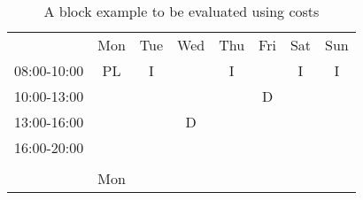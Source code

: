 \begin{table}[]
\centering
\caption{A block example to be evaluated using costs}
\label{my-label}
\begin{tabular}{llllllll}
\multicolumn{1}{c}{}             & \multicolumn{1}{c}{Mon}                         & \multicolumn{1}{c}{Tue} & \multicolumn{1}{c}{Wed}                        & \multicolumn{1}{c}{Thu} & \multicolumn{1}{c}{Fri}                        & \multicolumn{1}{c}{Sat} & \multicolumn{1}{c}{Sun} \\ \cline{2-8} 
\multicolumn{1}{c|}{08:00-10:00} & \multicolumn{1}{c|}{\cellcolor[HTML]{FCFF2F}PL} & \multicolumn{1}{c|}{I}  & \multicolumn{1}{c|}{}                          & \multicolumn{1}{c|}{I}  & \multicolumn{1}{c|}{}                          & \multicolumn{1}{c|}{I}  & \multicolumn{1}{c|}{I}  \\ \cline{2-8} 
\multicolumn{1}{c|}{10:00-13:00} & \multicolumn{1}{c|}{\cellcolor[HTML]{FCFF2F}}   & \multicolumn{1}{c|}{}   & \multicolumn{1}{c|}{}                          & \multicolumn{1}{c|}{}   & \multicolumn{1}{c|}{\cellcolor[HTML]{FCFF2F}D} & \multicolumn{1}{c}{}    & \multicolumn{1}{c}{}    \\ \cline{2-6}
\multicolumn{1}{c|}{13:00-16:00} & \multicolumn{1}{c|}{\cellcolor[HTML]{FCFF2F}}   & \multicolumn{1}{c|}{}   & \multicolumn{1}{c|}{\cellcolor[HTML]{FCFF2F}D} & \multicolumn{1}{c|}{}   & \multicolumn{1}{c|}{}                          & \multicolumn{1}{c}{}    & \multicolumn{1}{c}{}    \\ \cline{2-6}
\multicolumn{1}{c|}{16:00-20:00} & \multicolumn{1}{c|}{}                           & \multicolumn{1}{c|}{}   & \multicolumn{1}{c|}{}                          & \multicolumn{1}{c|}{}   & \multicolumn{1}{c|}{}                          & \multicolumn{1}{c}{}    & \multicolumn{1}{c}{}    \\ \cline{2-6}
                                 &                                                 &                         &                                                &                         &                                                &                         &                         \\
                                 & Mon                                             &                         &                                                &                         &                                                &                         &                         \\ \cline{2-2}

\end{tabular}
\end{table}
